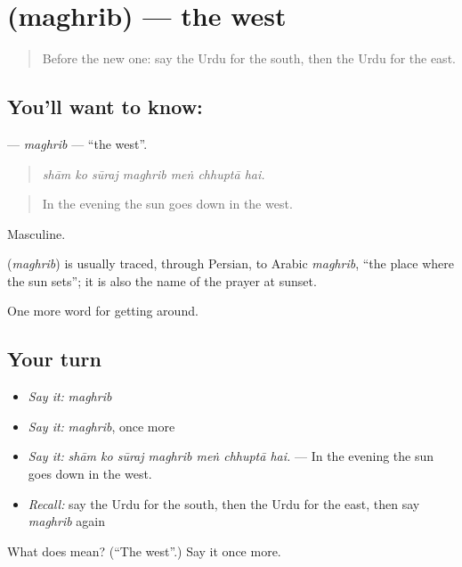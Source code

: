 \section[\texorpdfstring{\ur{مغرب} (maghrib)}{مغرب (maghrib)}]{ (maghrib) — the west}

\label{lesson:UR-C408-maghrib}



\begin{quote}
Before the new one: say the Urdu for the south, then the Urdu for the east.
\end{quote}

\subsection*{You'll want to know: }
\textbf{} — \emph{maghrib} — \textquotedblleft{}the west\textquotedblright{}.

\begin{quote}
      
\end{quote}

\begin{quote}
\emph{shām ko sūraj maghrib meṅ chhuptā hai.}
\end{quote}

\begin{quote}
In the evening the sun goes down in the west.
\end{quote}

Masculine.

\begin{cousinweb}
\textbf{} (\emph{maghrib}) is usually traced, through Persian, to Arabic \emph{maghrib}, \textquotedblleft{}the place where the sun sets\textquotedblright{}; it is also the name of the prayer at sunset.
\end{cousinweb}

\begin{grammarlens}[title={What you've built}]
One more word for getting around.
\end{grammarlens}

\subsection*{Your turn}
\begin{itemize}
\raggedright
  \item \emph{Say it:} \emph{maghrib}
  \item \emph{Say it:} \emph{maghrib}, once more
  \item \emph{Say it:} \emph{shām ko sūraj maghrib meṅ chhuptā hai.} — In the evening the sun goes down in the west.
  \item \emph{Recall:} say the Urdu for the south, then the Urdu for the east, then say \emph{maghrib} again
\end{itemize}

\begin{tcolorbox}[breakable,colback=teal!4,colframe=teal!35!black,title={Before you move on}]
What does  mean? (\textquotedblleft{}The west\textquotedblright{}.) Say it once more.
\end{tcolorbox}
